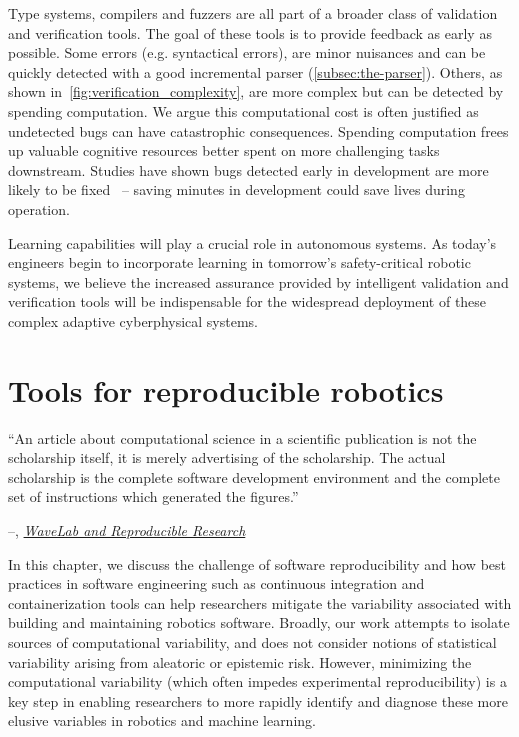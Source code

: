 \documentclass[12pt,initial,twoside,maitrise]{dms}
\numberwithin{equation}{section}
\numberwithin{table}{chapter}
\numberwithin{figure}{chapter}
\begin{document}
Type systems, compilers and fuzzers are all part of a broader class of validation and verification tools. The goal of these tools is to provide feedback as early as possible. Some errors (e.g. syntactical errors), are minor nuisances and can be quickly detected with a good incremental parser (\autoref{subsec:the-parser}). Others, as shown in~\autoref{fig:verification_complexity}, are more complex but can be detected by spending computation. We argue this computational cost is often justified as undetected bugs can have catastrophic consequences. Spending computation frees up valuable cognitive resources better spent on more challenging tasks downstream. Studies have shown bugs detected early in development are more likely to be fixed~\citep{distefano2019scaling} -- saving minutes in development could save lives during operation.

Learning capabilities will play a crucial role in autonomous systems. As today's engineers begin to incorporate learning in tomorrow's safety-critical robotic systems, we believe the increased assurance provided by intelligent validation and verification tools will be indispensable for the widespread deployment of these complex adaptive cyberphysical systems.

\chapter{Tools for reproducible robotics}\label{ch:ducker}

\setlength{\epigraphwidth}{0.70\textwidth}
\epigraph{``An article about computational science in a scientific publication is not the scholarship itself, it is merely advertising of the scholarship. The actual scholarship is the complete software development environment and the complete set of instructions which generated the figures.''}{\begin{flushright}--\citet{buckheit1995wavelab}, \href{https://statweb.stanford.edu/~wavelab/Wavelab_850/wavelab.pdf}{\textit{WaveLab and Reproducible Research}}\end{flushright}}

In this chapter, we discuss the challenge of software reproducibility and how best practices in software engineering such as continuous integration and containerization tools can help researchers mitigate the variability associated with building and maintaining robotics software. Broadly, our work attempts to isolate sources of computational variability, and does not consider notions of statistical variability arising from aleatoric or epistemic risk. However, minimizing the computational variability (which often impedes experimental reproducibility) is a key step in enabling researchers to more rapidly identify and diagnose these more elusive variables in robotics and machine learning.
\end{document}
